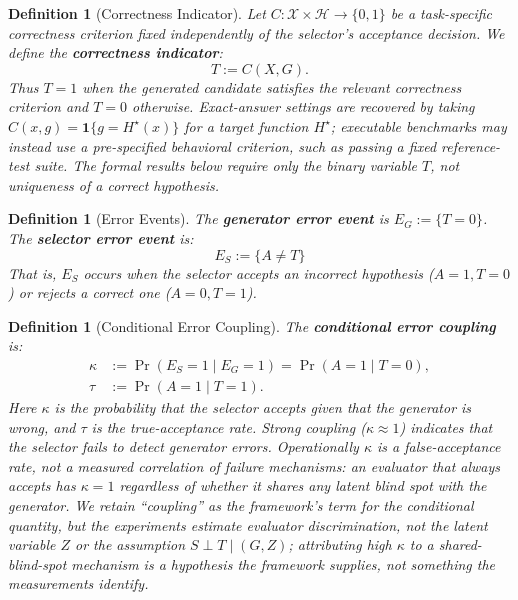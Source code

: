 \documentclass[a4paper,journal]{IAENGtran}
\newtheorem{Definition}[Theorem]{Definition}
\begin{document}
\begin{Definition}[Correctness Indicator]
Let $C:\mathcal{X}\times\mathcal{H}\to\{0,1\}$ be a task-specific correctness
criterion fixed independently of the selector's acceptance decision. We define the
\textbf{correctness indicator}:
\begin{equation}
T := C(X,G).
\end{equation}
Thus $T=1$ when the generated candidate satisfies the relevant correctness criterion and
$T=0$ otherwise. Exact-answer settings are recovered by taking
$C(x,g)=\mathbf{1}\{g=H^\star(x)\}$ for a target function $H^\star$; executable
benchmarks may instead use a pre-specified behavioral criterion, such as passing a fixed
reference-test suite. The formal results below require only the binary variable $T$, not
uniqueness of a correct hypothesis.
\end{Definition}

\begin{Definition}[Error Events]
The \textbf{generator error event} is $E_G := \{T = 0\}$. The \textbf{selector error
event} is:
\begin{equation}
E_S := \{A \neq T\}
\end{equation}
That is, $E_S$ occurs when the selector accepts an incorrect hypothesis ($A=1, T=0$) or
rejects a correct one ($A=0, T=1$).
\end{Definition}

\begin{Definition}[Conditional Error Coupling]
The \textbf{conditional error coupling} is:
\begin{align}
\kappa &:= \Pr(E_S = 1 \mid E_G = 1) = \Pr(A = 1 \mid T = 0), \\
\tau &:= \Pr(A = 1 \mid T = 1).
\end{align}
Here $\kappa$ is the probability that the selector accepts given that the generator is wrong,
and $\tau$ is the true-acceptance rate. Strong
coupling ($\kappa \approx 1$) indicates that the selector fails to detect generator errors.
Operationally $\kappa$ is a \emph{false-acceptance rate}, not a measured correlation of
failure mechanisms: an evaluator that always accepts has $\kappa=1$ regardless of whether
it shares any latent blind spot with the generator. We retain ``coupling'' as the
framework's term for the conditional quantity, but the experiments estimate evaluator
discrimination, not the latent variable $Z$ or the assumption
$S \perp T \mid (G,Z)$; attributing high $\kappa$ to a shared-blind-spot mechanism is a
hypothesis the framework supplies, not something the measurements identify.
\end{Definition}
\end{document}
